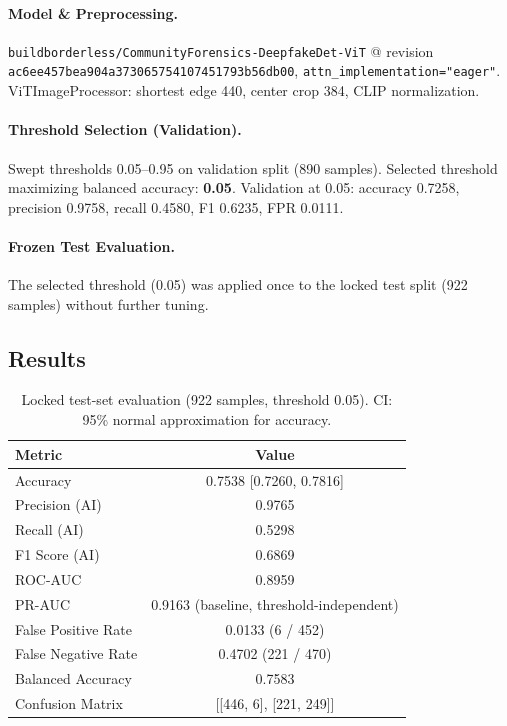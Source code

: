 \documentclass[10pt,conference,compsoc]{IEEEtran}
\begin{document}
\paragraph{Model \& Preprocessing.} \texttt{buildborderless/CommunityForensics-DeepfakeDet-ViT} @ revision \texttt{ac6ee457bea904a373065754107451793b56db00}, \texttt{attn\_implementation="eager"}. ViTImageProcessor: shortest edge 440, center crop 384, CLIP normalization.

\paragraph{Threshold Selection (Validation).} Swept thresholds 0.05–0.95 on validation split (890 samples). Selected threshold maximizing balanced accuracy: \textbf{0.05}.
Validation at 0.05: accuracy 0.7258, precision 0.9758, recall 0.4580, F1 0.6235, FPR 0.0111.

\paragraph{Frozen Test Evaluation.} The selected threshold (0.05) was applied once to the locked test split (922 samples) without further tuning.

\subsection{Results}
\label{sec:results}

\begin{table}[t]
\caption{Locked test-set evaluation (922 samples, threshold 0.05). CI: 95\% normal approximation for accuracy.}
\label{tab:test-results}
\centering
\begin{tabular}{lc}
\toprule
Metric & Value \\
\midrule
Accuracy & 0.7538 [0.7260, 0.7816] \\
Precision (AI) & 0.9765 \\
Recall (AI) & 0.5298 \\
F1 Score (AI) & 0.6869 \\
ROC-AUC & 0.8959 \\
PR-AUC & 0.9163 (baseline, threshold-independent) \\
False Positive Rate & 0.0133 (6 / 452) \\
False Negative Rate & 0.4702 (221 / 470) \\
Balanced Accuracy & 0.7583 \\
Confusion Matrix & [[446, 6], [221, 249]] \\
\bottomrule
\end{tabular}
\end{table}
\end{document}
